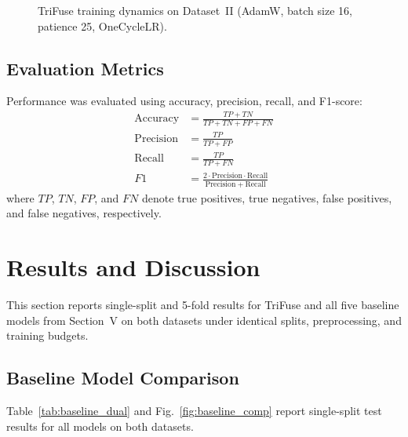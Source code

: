 \begin{figure}[!t]
\centering

\caption{TriFuse training dynamics on Dataset~II (AdamW, batch size 16, patience 25, OneCycleLR).}
\label{fig:training}
\end{figure}

\subsection{Evaluation Metrics}

Performance was evaluated using accuracy, precision, recall, and F1-score:
\begin{equation}
\begin{aligned}
\mathrm{Accuracy} &= \frac{TP + TN}{TP + TN + FP + FN} \\
\mathrm{Precision} &= \frac{TP}{TP + FP} \\
\mathrm{Recall} &= \frac{TP}{TP + FN} \\
F1 &= \frac{2 \cdot \mathrm{Precision} \cdot \mathrm{Recall}}{\mathrm{Precision} + \mathrm{Recall}}
\end{aligned}
\end{equation}
where $TP$, $TN$, $FP$, and $FN$ denote true positives, true negatives, false positives, and false negatives, respectively.

\section{Results and Discussion}

This section reports single-split and 5-fold results for TriFuse and all five baseline models from Section~V on both datasets under identical splits, preprocessing, and training budgets.

\subsection{Baseline Model Comparison}

Table~\ref{tab:baseline_dual} and Fig.~\ref{fig:baseline_comp} report single-split test results for all models on both datasets.

